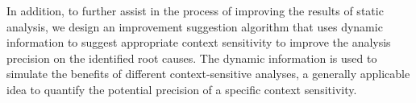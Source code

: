 In addition, to further assist in the process of improving the results of static analysis, we design an improvement suggestion algorithm that uses dynamic information to suggest appropriate context sensitivity to improve the analysis precision on the identified root causes. The dynamic information is used to simulate the benefits of different context-sensitive analyses, a generally applicable idea to quantify the potential precision of a specific context sensitivity.





